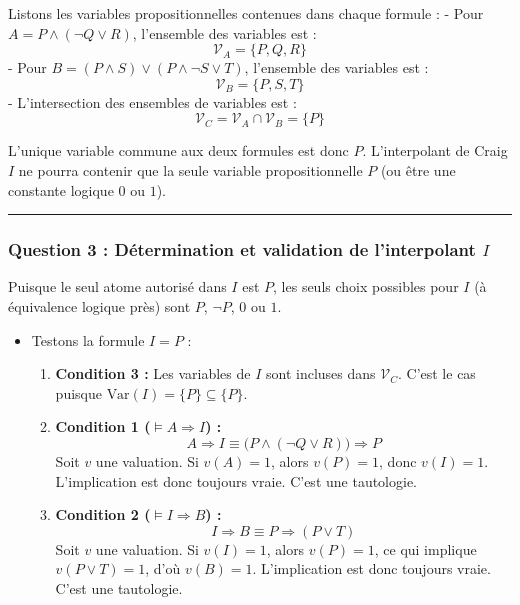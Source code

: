 \documentclass[11pt,a4paper]{article}
\begin{document}
Listons les variables propositionnelles contenues dans chaque formule :
- Pour \(A = P \land (\neg Q \lor R)\), l'ensemble des variables est :
\[\mathcal{V}_A = \{P, Q, R\}\] - Pour
\(B = (P \land S) \lor (P \land \neg S \lor T)\), l'ensemble des
variables est : \[\mathcal{V}_B = \{P, S, T\}\] - L'intersection des
ensembles de variables est :
\[\mathcal{V}_C = \mathcal{V}_A \cap \mathcal{V}_B = \{P\}\]

L'unique variable commune aux deux formules est donc \(P\).
L'interpolant de Craig \(I\) ne pourra contenir que la seule variable
propositionnelle \(P\) (ou être une constante logique \(0\) ou \(1\)).

\begin{center}\rule{0.5\linewidth}{0.5pt}\end{center}

\hypertarget{question-3-duxe9termination-et-validation-de-linterpolant-i}{%
\subsubsection{\texorpdfstring{Question 3 : Détermination et validation
de l'interpolant
\(I\)}{Question 3 : Détermination et validation de l'interpolant I}}\label{question-3-duxe9termination-et-validation-de-linterpolant-i}}

Puisque le seul atome autorisé dans \(I\) est \(P\), les seuls choix
possibles pour \(I\) (à équivalence logique près) sont \(P\),
\(\neg P\), \(0\) ou \(1\).

\begin{itemize}
\tightlist
\item
  Testons la formule \textbf{\(I = P\)} :

  \begin{enumerate}
  \def\labelenumi{\arabic{enumi}.}
  \tightlist
  \item
    \textbf{Condition 3 :} Les variables de \(I\) sont incluses dans
    \(\mathcal{V}_C\). C'est le cas puisque
    \(\text{Var}(I) = \{P\} \subseteq \{P\}\).
  \item
    \textbf{Condition 1 (\(\models A \Rightarrow I\)) :}
    \[A \Rightarrow I \equiv \big( P \land (\neg Q \lor R) \big) \Rightarrow P\]
    Soit \(v\) une valuation. Si \(v(A) = 1\), alors \(v(P) = 1\), donc
    \(v(I) = 1\). L'implication est donc toujours vraie. C'est une
    tautologie.
  \item
    \textbf{Condition 2 (\(\models I \Rightarrow B\)) :}
    \[I \Rightarrow B \equiv P \Rightarrow (P \lor T)\] Soit \(v\) une
    valuation. Si \(v(I) = 1\), alors \(v(P) = 1\), ce qui implique
    \(v(P \lor T) = 1\), d'où \(v(B) = 1\). L'implication est donc
    toujours vraie. C'est une tautologie.
  \end{enumerate}
\end{itemize}
\end{document}
